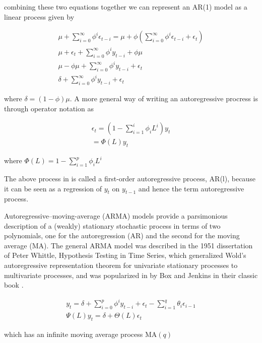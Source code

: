 \documentclass[
  11pt,
]{article}
\begin{document}
combining these two equations together we can represent an AR(1) model
as a linear process given by

\begin{gather*}
\mu + \sum\limits_{i=0}^{\infty}\phi^{i}\epsilon_{t-i} = \mu + \phi\left(\sum\limits_{i=0}^{\infty}\phi^{i}\epsilon_{t-i} + \epsilon_{t}\right) \\[8pt]
\mu + \epsilon_{t} + \sum\limits_{i=0}^{\infty}\phi^{i}y_{t-i} + \phi\mu \\[8pt]
\mu - \phi\mu + \sum\limits_{i=0}^{\infty}\phi^{i}y_{t-i} + \epsilon_{t} \\[8pt]
\delta + \sum\limits_{i=0}^{\infty}\phi^{i}y_{t- i} + \epsilon_{t}
\end{gather*}

where \(\delta = (1 - \phi)\mu\). A more general way of writing an
autoregressive procress is through operator notation as

\begin{gather*}
\epsilon_{t} = \left(1 - \sum\limits_{i=1}^{i}\phi_{i}L^{i} \right)y_{t} \\[8pt]
 = \Phi(L)y_{t}
\end{gather*}

where \(\Phi(L) = 1 - \sum\limits_{i=1}^{p}\phi_{i}L^{i}\)

The above process in is called a first-order autoregressive process,
AR(l), because it can be seen as a regression of \(y_{t}\) on
\(y_{t-1}\) and hence the term autoregressive process.

Autoregressive--moving-average (ARMA) models provide a parsimonious
description of a (weakly) stationary stochastic process in terms of two
polynomials, one for the autoregression (AR) and the second for the
moving average (MA). The general ARMA model was described in the 1951
dissertation of Peter Whittle, Hypothesis Testing in Time Series, which
generalized Wold's autoregressive representation theorem for univariate
stationary processes to multivariate processes, and was popularized in
by Box and Jenkins in their classic book \cite{box70}.

\begin{gather*}
y_{t} = \delta + \sum\limits_{i=0}^{p}\phi^{i}y_{t- i} + \epsilon_{t} - \sum\limits_{i=1}^{q}\theta_{i}\epsilon_{i-1} \\[8pt]
\Psi(L)y_{t} = \delta + \Theta(L)\epsilon_{t} 
\end{gather*}

which has an infinite moving average process \(\mathrm{MA}(q)\)
\end{document}
